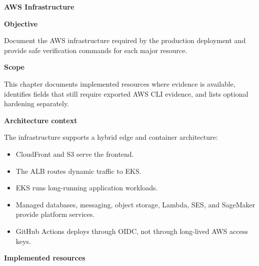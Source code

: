 \vspace{0.5em}\noindent\textbf{AWS Infrastructure}\par

\vspace{0.5em}\noindent\textbf{Objective}\par

Document the AWS infrastructure required by the production deployment
and provide safe verification commands for each major resource.

\vspace{0.5em}\noindent\textbf{Scope}\par

This chapter documents implemented resources where evidence is
available, identifies fields that still require exported AWS CLI
evidence, and lists optional hardening separately.

\vspace{0.5em}\noindent\textbf{Architecture context}\par

The infrastructure supports a hybrid edge and container architecture:

\begin{itemize}
\tightlist
\item
  CloudFront and S3 serve the frontend.
\item
  The ALB routes dynamic traffic to EKS.
\item
  EKS runs long-running application workloads.
\item
  Managed databases, messaging, object storage, Lambda, SES, and
  SageMaker provide platform services.
\item
  GitHub Actions deploys through OIDC, not through long-lived AWS access
  keys.
\end{itemize}

\vspace{0.5em}\noindent\textbf{Implemented resources}\par

